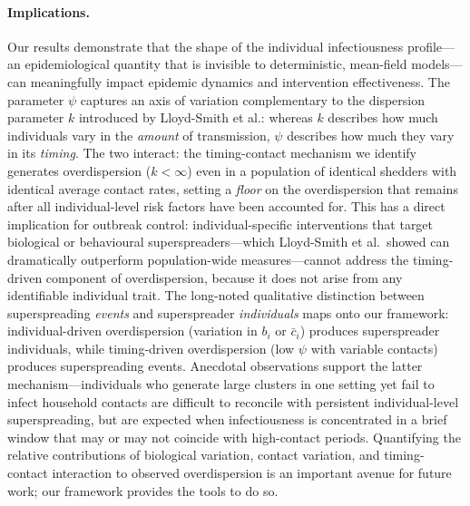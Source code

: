 \documentclass[10pt]{article}
\begin{document}
\paragraph{Implications.}
Our results demonstrate that the shape of the individual infectiousness profile---an epidemiological quantity that is invisible to deterministic, mean-field models---can meaningfully impact epidemic dynamics and intervention effectiveness. The parameter $\psi$ captures an axis of variation complementary to the dispersion parameter $k$ introduced by Lloyd-Smith et al.\citep{lloyd-smith_superspreading_2005}: whereas $k$ describes how much individuals vary in the \textit{amount} of transmission, $\psi$ describes how much they vary in its \textit{timing}. The two interact: the timing-contact mechanism we identify generates overdispersion ($k < \infty$) even in a population of identical shedders with identical average contact rates, setting a \textit{floor} on the overdispersion that remains after all individual-level risk factors have been accounted for. This has a direct implication for outbreak control: individual-specific interventions that target biological or behavioural superspreaders---which Lloyd-Smith et al.\ showed can dramatically outperform population-wide measures---cannot address the timing-driven component of overdispersion, because it does not arise from any identifiable individual trait. The long-noted qualitative distinction between superspreading \textit{events} and superspreader \textit{individuals}\citep{lloyd-smith_superspreading_2005} maps onto our framework: individual-driven overdispersion (variation in $b_i$ or $\bar{c}_i$) produces superspreader individuals, while timing-driven overdispersion (low $\psi$ with variable contacts) produces superspreading events. Anecdotal observations support the latter mechanism---individuals who generate large clusters in one setting yet fail to infect household contacts are difficult to reconcile with persistent individual-level superspreading, but are expected when infectiousness is concentrated in a brief window that may or may not coincide with high-contact periods. Quantifying the relative contributions of biological variation, contact variation, and timing-contact interaction to observed overdispersion is an important avenue for future work; our framework provides the tools to do so.
\end{document}
